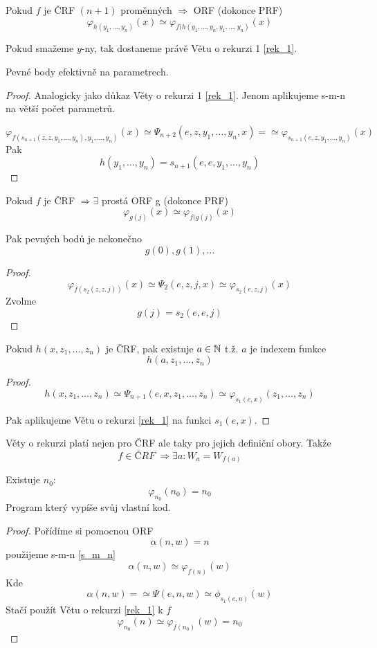 \begin{theorem}[O rekurzi 2]
	Pokud $f$ je ČRF $(n + 1)$ proměnných $\Rightarrow$ ORF (dokonce PRF)
	\[ \varphi_{h(y_1, \ldots, y_n)}(x) \simeq \varphi_{f(h(y_1, \ldots, y_n, y_1, \ldots, y_n)} (x) \]

	Pokud smažeme $y$-ny, tak dostaneme právě Větu o rekurzi 1 \cref{rek_1}.

	Pevné body efektivně na parametrech.
\end{theorem}
\begin{proof}
	Analogicky jako důkaz Věty o rekurzi 1 \cref{rek_1}.
	Jenom aplikujeme s-m-n na větší počet parametrů.

	\[ \varphi_{f(s_{n + 1}(z, z, y_1, \ldots, y_n), y_1, \ldots, y_n)} (x) \simeq \Psi_{n + 2}(e, z, y_1, \ldots, y_n, x) = \simeq \varphi_{s_{n+1}(e, z, y_1, \ldots, y_n)} (x) \]
	Pak
	\[ h(y_1, \ldots, y_n) = s_{n+1}(e, e, y_1, \ldots, y_n) \]
\end{proof}

\begin{theorem}
	Pokud $f$ je ČRF $\Rightarrow \exists$ prostá ORF g (dokonce PRF)
	\[ \varphi_{g(j)}(x) \simeq \varphi_{f(g(j)} (x) \]

	Pak pevných bodů je nekonečno
	\[ g(0), g(1), \ldots \]
\end{theorem}
\begin{proof}
	\[ \varphi_{f(s_2(z, z, j))} (x) \simeq \Psi_2(e, z, j, x) \simeq \varphi_{s_2(e, z, j)} (x) \]
	Zvolme
	\[ g(j) = s_2(e, e, j) \]
\end{proof}

\begin{theorem}[O rekurzi 3]
	Pokud $h(x, z_1, \ldots, z_n)$ je ČRF, pak existuje $a \in \operatorname{\mathbb{N}}$ t.ž. $a$ je indexem funkce
	\[ h(a, z_1, \ldots, z_n) \]
\end{theorem}
\begin{proof}
	\[ h(x, z_1, \ldots, z_n) \simeq \Psi_{n + 1}(e, x, z_1, \ldots, z_n) \simeq \varphi_{s_1(e, x)} (z_1, \ldots, z_n) \]

	Pak aplikujeme Větu o rekurzi \cref{rek_1} na funkci $s_1(e, x)$.
\end{proof}

\begin{note}
	Věty o rekurzi platí nejen pro ČRF ale taky pro jejich definiční obory.
	Takže
	\[ f \in ČRF\ \Rightarrow \exists a: W_a = W_{f(a)} \]
\end{note}

\begin{theorem}
	Existuje $n_0$:
	\[ \varphi_{n_0} (n_0) = n_0 \]
	Program který vypíše svůj vlastní kod.
\end{theorem}
\begin{proof}
	Pořídíme si pomocnou ORF
	\[ \alpha(n, w) = n \]
	použijeme s-m-n \cref{s_m_n}
	\[ \alpha(n, w) \simeq \varphi_{f(n)} (w) \]
	Kde
	\[ \alpha(n, w) = \simeq \Psi(e, n, w) \simeq \phi_{s_1(e, n)} (w) \]
	Stačí použít Větu o rekurzi \cref{rek_1} k $f$
	\[ \varphi_{n_0} (n) \simeq \varphi_{f(n_0)} (w) = n_0 \]
\end{proof}

